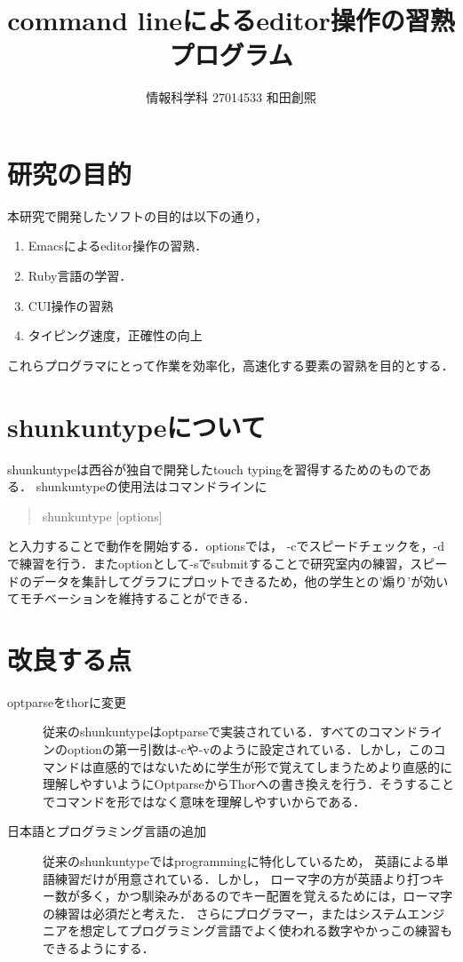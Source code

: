 \documentclass[a4j,twocolumn]{jsarticle}
\def\tightlist{\itemsep1pt\parskip0pt\parsep0pt}
\begin{document}
\title{command lineによるeditor操作の習熟プログラム}
\author{情報科学科 \hspace{5mm} 27014533 \hspace{5mm} 和田創煕}
\date{}
\maketitle

\section{研究の目的}
本研究で開発したソフトの目的は以下の通り，
\begin{enumerate}
\def\labelenumi{\arabic{enumi}.}
\tightlist
\item
Emacsによるeditor操作の習熟．
\item
Ruby言語の学習．
\item
CUI操作の習熟
\item
タイピング速度，正確性の向上
\end{enumerate}
これらプログラマにとって作業を効率化，高速化する要素の習熟を目的とする．


\section{shunkuntypeについて}
shunkuntypeは西谷が独自で開発したtouch typingを習得するためのものである．
shunkuntypeの使用法はコマンドラインに
\begin{quotation}
shunkuntype [options]
\end{quotation}
と入力することで動作を開始する．optionsでは，
-cでスピードチェックを，-dで練習を行う．またoptionとして-sでsubmitすることで研究室内の練習，スピードのデータを集計してグラフにプロットできるため，他の学生との'煽り'が効いてモチベーションを維持することができる．

\section{改良する点}
\begin{description}
\item[optparseをthorに変更] 
従来のshunkuntypeはoptparseで実装されている．すべてのコマンドラインのoptionの第一引数は-cや-vのように設定されている．しかし，このコマンドは直感的ではないために学生が形で覚えてしまうためより直感的に理解しやすいようにOptparseからThorへの書き換えを行う．そうすることでコマンドを形ではなく意味を理解しやすいからである．

\item[日本語とプログラミング言語の追加]
従来のshunkuntypeではprogrammingに特化しているため，
英語による単語練習だけが用意されている．しかし，
ローマ字の方が英語より打つキー数が多く，かつ馴染みがあるのでキー配置を覚えるためには，ローマ字の練習は必須だと考えた．
さらにプログラマー，またはシステムエンジニアを想定してプログラミング言語でよく使われる数字やかっこの練習もできるようにする．

\end{description}
\end{document}
